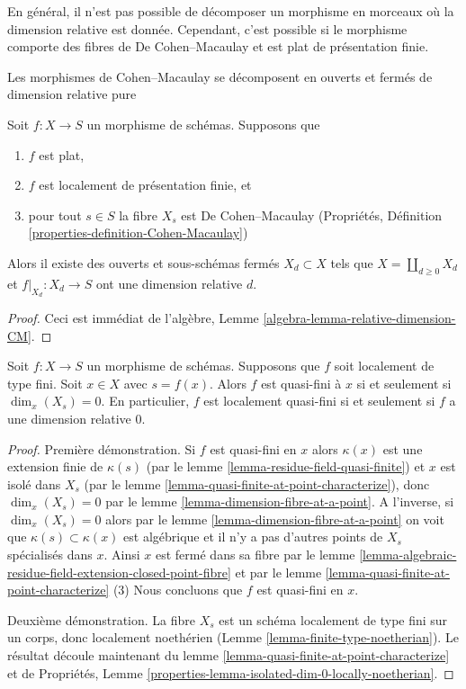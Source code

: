 \noindent
En général, il n'est pas possible de décomposer un morphisme
en morceaux où la dimension relative est donnée. Cependant,
c'est possible si le morphisme comporte des fibres de De Cohen--Macaulay
et est plat de présentation finie.

\begin{lemma}
\label{lemma-flat-finite-presentation-CM-fibres-relative-dimension}
\begin{slogan}
Les morphismes de Cohen--Macaulay se décomposent en ouverts et fermés de dimension relative pure
\end{slogan}
Soit $f : X \to S$ un morphisme de schémas. Supposons
que
\begin{enumerate}
\item $f$ est plat,
\item $f$ est localement de présentation finie, et
\item pour tout $s \in S$ la fibre $X_s$ est
De Cohen--Macaulay (Propriétés, Définition \ref{properties-definition-Cohen-Macaulay})
\end{enumerate}
Alors il existe des ouverts et sous-schémas fermés $X_d \subset X$
tels que $X = \coprod_{d \geq 0} X_d$ et $f|_{X_d} : X_d \to S$ ont une dimension
relative $d$.
\end{lemma}

\begin{proof}
Ceci est immédiat
de l'algèbre,
Lemme \ref{algebra-lemma-relative-dimension-CM}.
\end{proof}

\begin{lemma}
\label{lemma-locally-quasi-finite-rel-dimension-0}
Soit $f : X \to S$ un morphisme de schémas. Supposons que
$f$ soit localement de type fini. Soit
$x \in X$ avec $s = f(x)$. Alors $f$
est quasi-fini à $x$ si et seulement si $\dim_x(X_s) = 0$. En particulier,
$f$ est localement quasi-fini si et seulement si $f$ a une dimension relative
$0$.
\end{lemma}

\begin{proof}
Première démonstration.
Si $f$ est quasi-fini en $x$ alors
$\kappa(x)$ est
une extension finie de $\kappa(s)$ (par
le lemme \ref{lemma-residue-field-quasi-finite}) et $x$
est isolé dans $X_s$ (par le lemme
\ref{lemma-quasi-finite-at-point-characterize}), donc $\dim_x(X_s) = 0$
par le lemme \ref{lemma-dimension-fibre-at-a-point}. A l'inverse,
si $\dim_x(X_s) = 0$ alors par le
lemme \ref{lemma-dimension-fibre-at-a-point} on voit que $\kappa(s) \subset \kappa(x)$
est algébrique et il n'y a pas d'autres points
de $X_s$ spécialisés dans $x$.
Ainsi $x$ est fermé
dans sa fibre par le lemme \ref{lemma-algebraic-residue-field-extension-closed-point-fibre} et par le lemme
\ref{lemma-quasi-finite-at-point-characterize}
(3) Nous concluons que $f$
est quasi-fini en $x$.

\medskip\noindent
Deuxième démonstration. La fibre $X_s$ est un schéma
localement de type fini sur un corps, donc localement
noethérien (Lemme
\ref{lemma-finite-type-noetherian}). Le résultat découle maintenant
du lemme \ref{lemma-quasi-finite-at-point-characterize} et de Propriétés, Lemme \ref{properties-lemma-isolated-dim-0-locally-noetherian}.
\end{proof}

